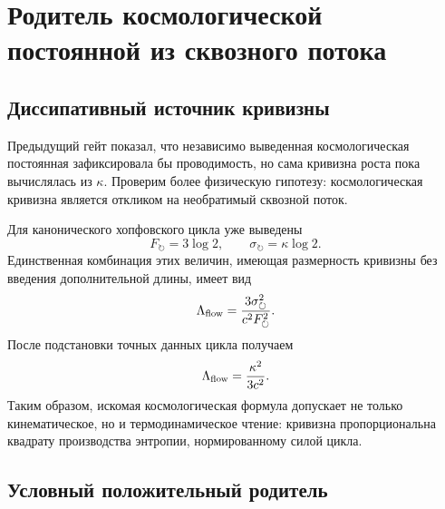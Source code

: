 \chapter{Родитель космологической постоянной из сквозного потока}
\label{ch:v10-cosmological-throughflow-parent}

\section{Диссипативный источник кривизны}

Предыдущий гейт показал, что независимо выведенная космологическая постоянная
зафиксировала бы проводимость, но сама кривизна роста пока вычислялась из
$\kappa$. Проверим более физическую гипотезу: космологическая кривизна
является откликом на необратимый сквозной поток.

Для канонического хопфовского цикла уже выведены
\begin{equation}
 F_\circlearrowright=3\log2,
 \qquad
 \sigma_\circlearrowright=\kappa\log2.
 \label{eq:v10-lambda-flow-inputs}
\end{equation}
Единственная комбинация этих величин, имеющая размерность кривизны без
введения дополнительной длины, имеет вид
\begin{equation}
 \Lambda_{\rm flow}
 =\frac{3\sigma_\circlearrowright^2}
 {c^2F_\circlearrowright^2}.
 \label{eq:v10-lambda-flow-response}
\end{equation}
После подстановки точных данных цикла получаем
\begin{equation}
 \Lambda_{\rm flow}=\frac{\kappa^2}{3c^2}.
 \label{eq:v10-lambda-flow-conductance}
\end{equation}
Таким образом, искомая космологическая формула допускает не только
кинематическое, но и термодинамическое чтение: кривизна пропорциональна
квадрату производства энтропии, нормированному силой цикла.

\section{Условный положительный родитель}

